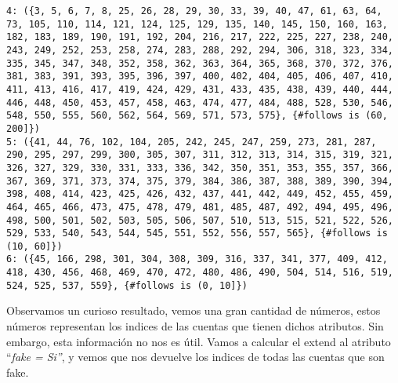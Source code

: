 \documentclass[
  letterpaper,
  DIV=11,
  numbers=noendperiod]{scrreprt}
\newenvironment{Shaded}{\begin{snugshade}}{\end{snugshade}}
\newcommand{\AttributeTok}[1]{\textcolor[rgb]{0.40,0.45,0.13}{#1}}
\newcommand{\FunctionTok}[1]{\textcolor[rgb]{0.28,0.35,0.67}{#1}}
\newcommand{\NormalTok}[1]{\textcolor[rgb]{0.00,0.23,0.31}{#1}}
\newcommand{\OtherTok}[1]{\textcolor[rgb]{0.00,0.23,0.31}{#1}}
\newcommand{\SpecialCharTok}[1]{\textcolor[rgb]{0.37,0.37,0.37}{#1}}
\newcommand{\StringTok}[1]{\textcolor[rgb]{0.13,0.47,0.30}{#1}}
\begin{document}
\begin{verbatim}
4: ({3, 5, 6, 7, 8, 25, 26, 28, 29, 30, 33, 39, 40, 47, 61, 63, 64, 73, 105, 110, 114, 121, 124, 125, 129, 135, 140, 145, 150, 160, 163, 182, 183, 189, 190, 191, 192, 204, 216, 217, 222, 225, 227, 238, 240, 243, 249, 252, 253, 258, 274, 283, 288, 292, 294, 306, 318, 323, 334, 335, 345, 347, 348, 352, 358, 362, 363, 364, 365, 368, 370, 372, 376, 381, 383, 391, 393, 395, 396, 397, 400, 402, 404, 405, 406, 407, 410, 411, 413, 416, 417, 419, 424, 429, 431, 433, 435, 438, 439, 440, 444, 446, 448, 450, 453, 457, 458, 463, 474, 477, 484, 488, 528, 530, 546, 548, 550, 555, 560, 562, 564, 569, 571, 573, 575}, {#follows is (60, 200]})
5: ({41, 44, 76, 102, 104, 205, 242, 245, 247, 259, 273, 281, 287, 290, 295, 297, 299, 300, 305, 307, 311, 312, 313, 314, 315, 319, 321, 326, 327, 329, 330, 331, 333, 336, 342, 350, 351, 353, 355, 357, 366, 367, 369, 371, 373, 374, 375, 379, 384, 386, 387, 388, 389, 390, 394, 398, 408, 414, 423, 425, 426, 432, 437, 441, 442, 449, 452, 455, 459, 464, 465, 466, 473, 475, 478, 479, 481, 485, 487, 492, 494, 495, 496, 498, 500, 501, 502, 503, 505, 506, 507, 510, 513, 515, 521, 522, 526, 529, 533, 540, 543, 544, 545, 551, 552, 556, 557, 565}, {#follows is (10, 60]})
6: ({45, 166, 298, 301, 304, 308, 309, 316, 337, 341, 377, 409, 412, 418, 430, 456, 468, 469, 470, 472, 480, 486, 490, 504, 514, 516, 519, 524, 525, 537, 559}, {#follows is (0, 10]})
\end{verbatim}

Observamos un curioso resultado, vemos una gran cantidad de números,
estos números representan los indices de las cuentas que tienen dichos
atributos. Sin embargo, esta información no nos es útil. Vamos a
calcular el extend al atributo ``\emph{fake = Si''}, y vemos que nos
devuelve los indices de todas las cuentas que son fake.

\begin{Shaded}
\end{Shaded}
\end{document}
